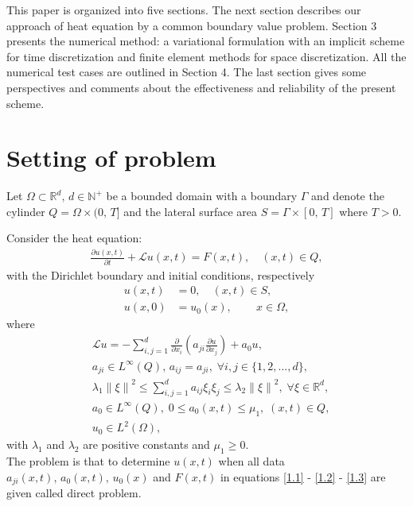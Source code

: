 \documentclass[twocolumn]{article}
\begin{document}
This paper is organized into five sections. The next section 
describes our approach of heat equation by a common boundary value problem. Section 3 presents the numerical method: a variational formulation with an implicit scheme for time discretization and finite element methods for space discretization. All the numerical test cases are outlined in Section 4.  The last section gives some perspectives and comments about the effectiveness and reliability of the present scheme.
\section{Setting of problem}
\quad Let $\Omega \subset \mathbb{R}^d,\, d\in \mathbb{N^+}$ be a bounded domain with a boundary $\Gamma$ and denote the cylinder $Q=\Omega\times (0,\, T]$ and the lateral surface area $S=\Gamma \times [0,\, T]$ where $T>0$. 

Consider the heat equation:
\begin{align}\label{1.1}
	\frac{\partial u(x, t)}{\partial t}+\mathcal{L}u(x, t)=F(x, t), \quad(x, t)\in Q,
\end{align}
with the Dirichlet boundary and initial conditions, respectively
\begin{align}
	u(x, t)&=0,\quad(x, t)\in S, \label{1.2}\\
	u(x, 0)&=u_0(x),\quad\quad\, x\in \Omega,\label{1.3}
\end{align}
where
\begin{align*}
	&\mathcal{L}u = -\sum_{i, j=1}^{d}\frac{\partial}{\partial x_i}\left(a_{ji}\frac{\partial u}{\partial x_j}\right)+a_0u,\\
	&a_{ji}\in L^{\infty}(Q),\, a_{ij}=a_{ji},\; \forall i, j\in \{1, 2, ..., d\},\\
	&\lambda_1\left\|\xi\right\|^2\leq \sum_{i, j=1}^{d}a_{ij}\xi_i\xi_j\leq \lambda_2\left\|\xi\right\|^2,\; \forall \xi\in\mathbb{R}^d,\\
	&a_0\in L^{\infty}(Q),\; 0\leq a_0(x, t)\leq \mu_1,\; (x, t)\in Q,\\ 
	&u_0\in L^2(\Omega),%
\end{align*}
with $\lambda_1$ and $\lambda_2$ are positive constants and $\mu_1\geq 0$.
\\

The problem is that to determine $u(x, t)$ when all data $a_{ji}(x, t),\,a_0(x, t),\,u_0(x)$ and $F(x, t)$ in equations \eqref{1.1} - \eqref{1.2} - \eqref{1.3} are given called direct problem.
\end{document}

